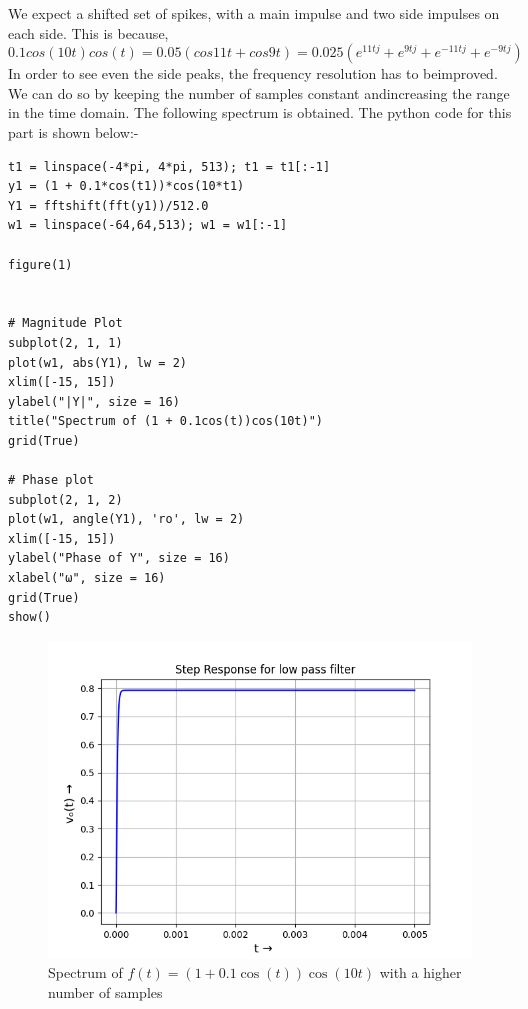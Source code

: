 \documentclass{article}
\begin{document}
We  expect  a  shifted  set  of  spikes,  with  a  main  impulse  and  two  side impulses on each side.  This is because,
\begin{equation}
    0.1cos(10t)cos(t) = 0.05(cos11t+cos9t)= 0.025(e^{11tj}+e^{9tj}+e^{-11tj}+e^{-9tj})
\end{equation}
In  order  to  see  even  the  side  peaks,  the  frequency  resolution  has  to  beimproved.  We can do so by keeping the number of samples constant andincreasing the range in the time domain.  The following spectrum is obtained.
The python code for this part is shown below:-
\begin{lstlisting}
t1 = linspace(-4*pi, 4*pi, 513); t1 = t1[:-1] 
y1 = (1 + 0.1*cos(t1))*cos(10*t1) 
Y1 = fftshift(fft(y1))/512.0  
w1 = linspace(-64,64,513); w1 = w1[:-1]

figure(1)


# Magnitude Plot
subplot(2, 1, 1)
plot(w1, abs(Y1), lw = 2)
xlim([-15, 15])
ylabel("|Y|", size = 16)
title("Spectrum of (1 + 0.1cos(t))cos(10t)")
grid(True)

# Phase plot 
subplot(2, 1, 2)
plot(w1, angle(Y1), 'ro', lw = 2)
xlim([-15, 15])
ylabel("Phase of Y", size = 16)
xlabel("ω", size = 16)
grid(True)
show()
\end{lstlisting}
\begin{figure}[h!]
\centering
\includegraphics[scale=0.6]{Figure_1.png}
\caption{Spectrum of $f(t) = (1+0.1\cos(t))\cos(10t)$ with a higher number of samples}
\label{fig:universe}
\end{figure}
\clearpage
\end{document}
